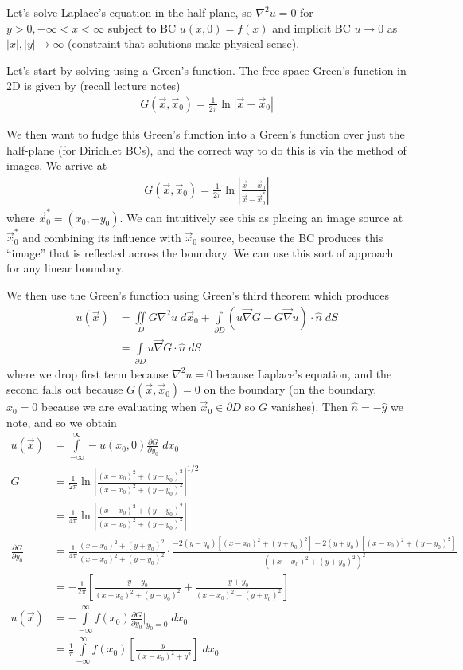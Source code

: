 \documentclass[10pt]{report}
\newcommand{\pd}[2]{\frac{\partial #1}{\partial#2}}
\newcommand{\abs}[1]{\left|#1\right|}
\begin{document}
Let's solve Laplace's equation in the half-plane, so $\nabla^2 u = 0$ for $y > 0, -\infty < x < \infty$ subject to BC $u(x,0) = f(x)$ and implicit BC $u \to 0$ as $\abs{x}, \abs{y} \to \infty$ (constraint that solutions make physical sense).

Let's start by solving using a Green's function. The free-space Green's function in 2D is given by (recall lecture notes)
\begin{align}
    G(\vec{x}, \vec{x}_0) = \frac{1}{2\pi}\ln \abs{\vec{x} - \vec{x}_0}
\end{align}

We then want to fudge this Green's function into a Green's function over just the half-plane (for Dirichlet BCs), and the correct way to do this is via the method of images. We arrive at
\begin{align}
    G(\vec{x}, \vec{x}_0) = \frac{1}{2\pi}\ln \abs{\frac{\vec{x} - \vec{x}_0}{\vec{x} - \vec{x}^*_0}}
\end{align}
where $\vec{x}_0^* = (x_0, -y_0)$. We can intuitively see this as placing an image source at $\vec{x}_0^*$ and combining its influence with $\vec{x}_0$ source, because the BC produces this ``image'' that is reflected across the boundary. We can use this sort of approach for any linear boundary.

We then use the Green's function using Green's third theorem which produces
\begin{align}
    u(\vec{x}) &= \iint\limits_D G\nabla^2u\; d\vec{x}_0 + \int\limits_{\partial D}^{}\left( u\vec{\nabla}G - G\vec{\nabla}u \right)\cdot \hat{n}\;dS\\
    &= \int\limits_{\partial D}^{}u\vec{\nabla}G \cdot \hat{n}\;dS
\end{align}
where we drop first term because $\nabla^2u = 0$ because Laplace's equation, and the second falls out because $G(\vec{x}, \vec{x}_0) = 0$ on the boundary (on the boundary, $x_0 = 0$ because we are evaluating when $\vec{x}_0 \in \partial D$ so $G$ vanishes). Then $\hat{n} = -\hat{y}$ we note, and so we obtain
\begin{align}
    u(\vec{x}) &= \int\limits_{-\infty}^{\infty}-u(x_0,0)\pd{G}{y_0}\;dx_0\\
    G &= \frac{1}{2\pi}\ln\abs{\frac{(x-x_0)^2 + (y-y_0)^2}{(x-x_0)^2 + (y + y_0)^2}}^{1/2}\\
    &= \frac{1}{4\pi}\ln\abs{\frac{(x-x_0)^2 + (y-y_0)^2}{(x-x_0)^2 + (y + y_0)^2}}\\
    \pd{G}{y_0} &= \frac{1}{4\pi}\frac{(x-x_0)^2 + (y + y_0)^2}{(x-x_0)^2 + (y-y_0)^2} \cdot \frac{-2\left( y-y_0 \right)\left[ (x-x_0)^2 + (y+y_0)^2 \right] - 2(y+y_0)\left[ (x-x_0)^2 + (y-y_0)^2 \right]}{\left((x-x_0)^2 + (y + y_0)^2\right)^2}\\
    &= -\frac{1}{2\pi}\left[ \frac{y-y_0}{(x-x_0)^2 + (y-y_0)^2} + \frac{y+y_0}{(x-x_0)^2 + (y+y_0)^2} \right]\\
    u(\vec{x}) &= -\int\limits_{-\infty}^{\infty}f(x_0)\pd{G}{y_0}\Bigg|_{y_0 = 0}\;dx_0\\
    &= \frac{1}{\pi}\int\limits_{-\infty}^{\infty}f(x_0)\left[ \frac{y}{\left( x-x_0 \right)^2 + y^2} \right]\;dx_0\label{Greensol}
\end{align}
\end{document}
